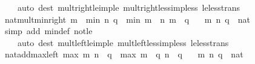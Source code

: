\begin{isabellebody}
\ \ \ \ {\isacharparenleft}{\kern0pt}auto\ dest{\isacharcolon}{\kern0pt}\ mult{\isacharunderscore}{\kern0pt}right{\isacharunderscore}{\kern0pt}le{\isacharunderscore}{\kern0pt}imp{\isacharunderscore}{\kern0pt}le\ mult{\isacharunderscore}{\kern0pt}right{\isacharunderscore}{\kern0pt}less{\isacharunderscore}{\kern0pt}imp{\isacharunderscore}{\kern0pt}less\ le{\isacharunderscore}{\kern0pt}less{\isacharunderscore}{\kern0pt}trans{\isacharparenright}{\kern0pt}%
\endisatagproof
{\isafoldproof}%
%
\isadelimproof
\isanewline
%
\endisadelimproof
\isanewline
{}\isamarkupfalse%
\ nat{\isacharunderscore}{\kern0pt}mult{\isacharunderscore}{\kern0pt}min{\isacharunderscore}{\kern0pt}right{\isacharcolon}{\kern0pt}\ {\isachardoublequoteopen}m\ {\isacharasterisk}{\kern0pt}\ min\ n\ q\ {\isacharequal}{\kern0pt}\ min\ {\isacharparenleft}{\kern0pt}m\ {\isacharasterisk}{\kern0pt}\ n{\isacharparenright}{\kern0pt}\ {\isacharparenleft}{\kern0pt}m\ {\isacharasterisk}{\kern0pt}\ q{\isacharparenright}{\kern0pt}{\isachardoublequoteclose}\isanewline
\ \ \ m\ n\ q\ {\isacharcolon}{\kern0pt}{\isacharcolon}{\kern0pt}\ nat\isanewline
%
\isadelimproof
\ \ %
\endisadelimproof
%
\isatagproof
{}\isamarkupfalse%
\ {\isacharparenleft}{\kern0pt}simp\ add{\isacharcolon}{\kern0pt}\ min{\isacharunderscore}{\kern0pt}def\ not{\isacharunderscore}{\kern0pt}le{\isacharparenright}{\kern0pt}\isanewline
\ \ \ \ {\isacharparenleft}{\kern0pt}auto\ dest{\isacharcolon}{\kern0pt}\ mult{\isacharunderscore}{\kern0pt}left{\isacharunderscore}{\kern0pt}le{\isacharunderscore}{\kern0pt}imp{\isacharunderscore}{\kern0pt}le\ mult{\isacharunderscore}{\kern0pt}left{\isacharunderscore}{\kern0pt}less{\isacharunderscore}{\kern0pt}imp{\isacharunderscore}{\kern0pt}less\ le{\isacharunderscore}{\kern0pt}less{\isacharunderscore}{\kern0pt}trans{\isacharparenright}{\kern0pt}%
\endisatagproof
{\isafoldproof}%
%
\isadelimproof
\isanewline
%
\endisadelimproof
\isanewline
{}\isamarkupfalse%
\ nat{\isacharunderscore}{\kern0pt}add{\isacharunderscore}{\kern0pt}max{\isacharunderscore}{\kern0pt}left{\isacharcolon}{\kern0pt}\ {\isachardoublequoteopen}max\ m\ n\ {\isacharplus}{\kern0pt}\ q\ {\isacharequal}{\kern0pt}\ max\ {\isacharparenleft}{\kern0pt}m\ {\isacharplus}{\kern0pt}\ q{\isacharparenright}{\kern0pt}\ {\isacharparenleft}{\kern0pt}n\ {\isacharplus}{\kern0pt}\ q{\isacharparenright}{\kern0pt}{\isachardoublequoteclose}\isanewline
\ \ \ m\ n\ q\ {\isacharcolon}{\kern0pt}{\isacharcolon}{\kern0pt}\ nat\isanewline
%
\isadelimproof
\ \ %
\endisadelimproof
%
\isatagproof

\end{isabellebody}
